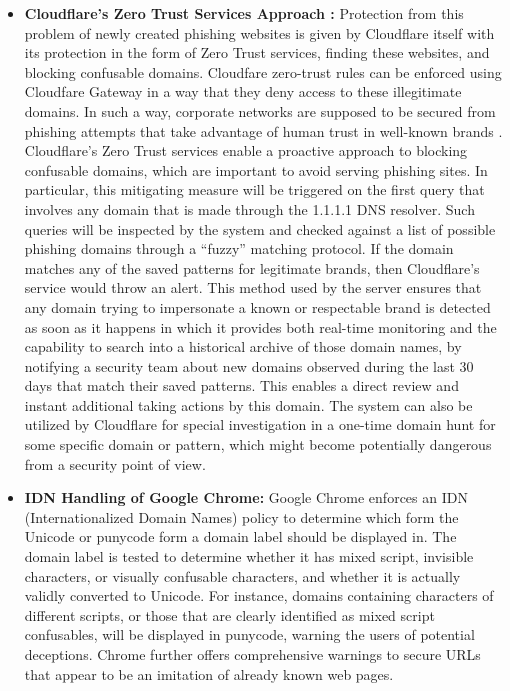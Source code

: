 \begin{itemize}
    \item \textbf{Cloudflare's Zero Trust Services Approach :} Protection from this problem of newly created phishing websites is given by Cloudflare itself with its protection in the form of Zero Trust services, finding these websites, and blocking confusable domains. Cloudfare zero-trust rules can be enforced using Cloudfare Gateway in a way that they deny access to these illegitimate domains. In such a way, corporate networks are supposed to be secured from phishing attempts that take advantage of human trust in well-known brands \cite{Cloudflare2023}. Cloudflare's Zero Trust services enable a proactive approach to blocking confusable domains, which are important to avoid serving phishing sites. In particular, this mitigating measure will be triggered on the first query that involves any domain that is made through the 1.1.1.1 DNS resolver. Such queries will be inspected by the system and checked against a list of possible phishing domains through a “fuzzy” matching protocol. If the domain matches any of the saved patterns for legitimate brands, then Cloudflare's service would throw an alert. This method used by the server ensures that any domain trying to impersonate a known or respectable brand is detected as soon as it happens in which it provides both real-time monitoring and the capability to search into a historical archive of those domain names, by notifying a security team about new domains observed during the last 30 days that match their saved patterns. This enables a direct review and instant additional taking actions by this domain. The system can also be utilized by Cloudflare for special investigation in a one-time domain hunt for some specific domain or pattern, which might become potentially dangerous from a security point of view.

     \item \textbf{IDN Handling of Google Chrome: } Google Chrome enforces an IDN (Internationalized Domain Names) policy to determine which form the Unicode or punycode form a domain label should be displayed in. The domain label is tested to determine whether it has mixed script, invisible characters, or visually confusable characters, and whether it is actually validly converted to Unicode. For instance, domains containing characters of different scripts, or those that are clearly identified as mixed script confusables, will be displayed in punycode, warning the users of potential deceptions. Chrome further offers comprehensive warnings to secure URLs that appear to be an imitation of already known web pages. \cite{ChromiumIDN}
     
\end{itemize}

